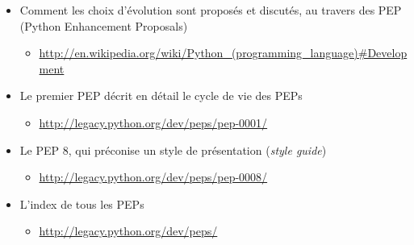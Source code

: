     \begin{itemize}
\tightlist
\item
  Comment les choix d'évolution sont proposés et discutés, au travers
  des PEP (Python Enhancement Proposals)

  \begin{itemize}
  \tightlist
  \item
    \href{http://en.wikipedia.org/wiki/Python\_(programming\_language)\#Development}{http://en.wikipedia.org/wiki/Python\_(programming\_language)\#Development}
  \end{itemize}
\item
  Le premier PEP décrit en détail le cycle de vie des PEPs

  \begin{itemize}
  \tightlist
  \item
    \href{http://legacy.python.org/dev/peps/pep-0001/}{http://legacy.python.org/dev/peps/pep-0001/}
  \end{itemize}
\item
  Le PEP 8, qui préconise un style de présentation (\emph{style guide})

  \begin{itemize}
  \tightlist
  \item
    \href{http://legacy.python.org/dev/peps/pep-0008/}{http://legacy.python.org/dev/peps/pep-0008/}
  \end{itemize}
\item
  L'index de tous les PEPs

  \begin{itemize}
  \tightlist
  \item
    \href{http://legacy.python.org/dev/peps/}{http://legacy.python.org/dev/peps/}
  \end{itemize}
\end{itemize}